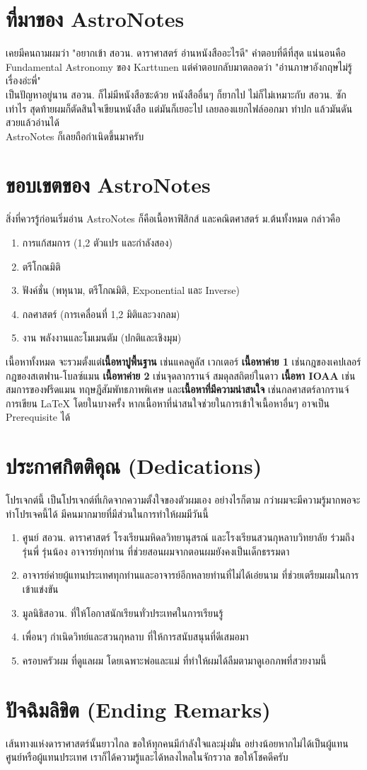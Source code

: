 \documentclass[12pt, a4paper, oneside]{article}
\begin{document}
\section{ที่มาของ AstroNotes}
เคยมีคนถามผมว่า "อยากเข้า สอวน. ดาราศาสตร์ อ่านหนังสืออะไรดี" 
คำตอบที่ดีที่สุด แน่นอนคือ Fundamental Astronomy ของ Karttunen\cite{karttunen2007fundamental} แต่คำตอบกลับมาตลอดว่า "อ่านภาษาอังกฤษไม่รู้เรื่องอ่ะพี่"\\
เป็นปัญหาอยู่นาน สอวน. ก็ไม่มีหนังสือซะด้วย หนังสืออื่นๆ ก็ยากไป ไม่ก็ไม่เหมาะกับ สอวน. ซักเท่าไร สุดท้ายผมก็ตัดสินใจเขียนหนังสือ แต่มันก็เยอะไป เลยลองแยกไฟล์ออกมา ทำปก แล้วมันดันสวยแล้วอ่านได้\\
AstroNotes ก็เลยถือกำเนิดขึ้นมาครับ


\section{ขอบเขตของ AstroNotes}
สิ่งที่ควรรู้ก่อนเริ่มอ่าน AstroNotes ก็คือเนื้อหาฟิสิกส์ และคณิตศาสตร์ ม.ต้นทั้งหมด กล่าวคือ
\begin{enumerate}
    \item การแก้สมการ (1,2 ตัวแปร และกำลังสอง)
    \item ตรีโกณมิติ
    \item ฟังค์ชั่น (พหุนาม, ตรีโกณมิติ, Exponential และ Inverse)
    \item กลศาสตร์ (การเคลื่อนที่ 1,2 มิติและวงกลม)
    \item งาน พลังงานและโมเมนตัม (ปกติและเชิงมุม)
\end{enumerate}
เนื้อหาทั้งหมด จะรวมตั้งแต่\textbf{เนื้อหาปูพื้นฐาน} เช่นแคลคูลัส เวกเตอร์ \textbf{เนื้อหาค่าย 1} เช่นกฎของเคปเลอร์ กฎของสเตฟาน-โบลซ์แมน \textbf{เนื้อหาค่าย 2} เช่นจุดลากรานจ์ สมดุลสถิตย์ในดาว \textbf{เนื้อหา IOAA} เช่นสมการของฟรีดแมน ทฤษฎีสัมพัทธภาพพิเศษ และ\textbf{เนื้อหาที่มีความน่าสนใจ} เช่นกลศาสตร์ลากรานจ์ การเขียน LaTeX โดยในบางครั้ง หากเนื้อหาที่น่าสนใจช่วยในการเข้าใจเนื้อหาอื่นๆ อาจเป็น Prerequisite ได้

\section{ประกาศกิตติคุณ (Dedications)}
โปรเจกต์นี้ เป็นโปรเจกต์ที่เกิดจากความตั้งใจของตัวผมเอง อย่างไรก็ตาม กว่าผมจะมีความรู้มากพอจะทำโปรเจคนี้ได้ มีคนมากมายที่มีส่วนในการทำให้ผมมีวันนี้
\begin{enumerate}
    \item ศูนย์ สอวน. ดาราศาสตร์ โรงเรียนมหิดลวิทยานุสรณ์ และโรงเรียนสวนกุหลาบวิทยาลัย ร่วมถึงรุ่นพี่ รุ่นน้อง อาจารย์ทุกท่าน ที่ช่วยสอนผมจากตอนผมยังคงเป็นเด็กธรรมดา
    \item อาจารย์ค่ายผู้แทนประเทศทุกท่านและอาจารย์อีกหลายท่านที่ไม่ได้เอ่ยนาม ที่ช่วยเตรียมผมในการเข้าแข่งขัน
    \item มูลนิธิสอวน. ที่ให้โอกาสนักเรียนทั่วประเทศในการเรียนรู้
    \item เพื่อนๆ กำเนิดวิทย์และสวนกุหลาบ ที่ให้การสนับสนุนที่ดีเสมอมา
    \item ครอบครัวผม ที่ดูแลผม โดยเฉพาะพ่อและแม่ ที่ทำให้ผมได้ลืมตามาดูเอกภพที่สวยงามนี้
\end{enumerate}

\section{ปัจฉิมลิขิต (Ending Remarks)}
เส้นทางแห่งดาราศาสตร์นั้นยาวไกล ขอให้ทุกคนมีกำลังใจและมุ่งมั่น อย่างน้อยหากไม่ได้เป็นผู้แทนศูนย์หรือผู้แทนประเทศ เราก็ได้ความรู้และได้หลงไหลในจักรวาล ขอให้โชคดีครับ


\end{document}
